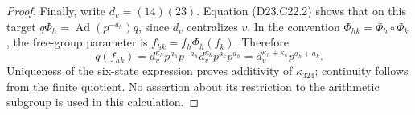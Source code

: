 \begin{proof}
Finally, write $d_v=(14)(23)$. Equation (D23.C22.2) shows
that on this target
$q\Phi_h=\operatorname{Ad}(p^{-a_h})q$, since $d_v$
centralizes $v$. In the convention
$\Phi_{hk}=\Phi_h\circ\Phi_k$, the free-group parameter is
$f_{hk}=f_h\Phi_h(f_k)$. Therefore
\[
 q(f_{hk})
 =d_v^{\kappa_h}p^{a_h}
   p^{-a_h}d_v^{\kappa_k}p^{a_k}p^{a_h}
 =d_v^{\kappa_h+\kappa_k}p^{a_h+a_k}.
\]
Uniqueness of the six-state expression proves additivity of
$\kappa_{324}$; continuity follows from the finite quotient.
No assertion about its restriction to the arithmetic subgroup
is used in this calculation.
\end{proof}
